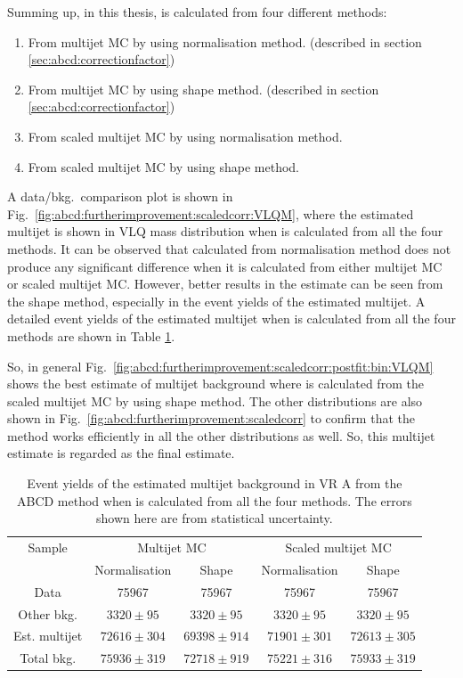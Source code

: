 Summing up, in this thesis, \R is calculated from four different methods:
\begin{enumerate}
	\item From multijet MC by using normalisation method. (described in section \ref{sec:abcd:correctionfactor})
	\item From multijet MC by using shape method. (described in section \ref{sec:abcd:correctionfactor})
	\item From scaled multijet MC by using normalisation method.
	\item From scaled multijet MC by using shape method.
\end{enumerate}

A data/bkg.\ comparison plot is shown in Fig.\ \ref{fig:abcd:furtherimprovement:scaledcorr:VLQM}, where the estimated multijet is shown in VLQ mass distribution when \R is calculated from all the four methods. It can be observed that \R calculated from normalisation method does not produce any significant difference when it is calculated from either multijet MC or scaled multijet MC. However, better results in the estimate can be seen from the shape method, especially in the event yields of the estimated multijet. A detailed event yields of the estimated multijet when \R is calculated from all the four methods are shown in Table \ref{table:abcd:furtherimprovement:scaledcorr}. 

So, in general Fig.\ \ref{fig:abcd:furtherimprovement:scaledcorr:postfit:bin:VLQM} shows the best estimate of multijet background where \R is calculated from the scaled multijet MC by using shape method. The other distributions are also shown in Fig.\ \ref{fig:abcd:furtherimprovement:scaledcorr} to confirm that the method works efficiently in all the other distributions as well. So, this multijet estimate is regarded as the final estimate.

\begin{table}[hbt!]
	\centering
	\begin{tabular}{c|c|c|c|c} 
		\toprule
		Sample & \multicolumn{2}{c}{Multijet MC} \vline & \multicolumn{2}{c}{Scaled multijet MC} \\ \cline{2-5} 
		 & Normalisation & Shape & Normalisation & Shape \\ 
		\midrule
		Data & 75967 & 75967 & 75967 & 75967 \\
		Other bkg. & $\num{3320}\pm\num{95}$ & $\num{3320}\pm\num{95}$ & $\num{3320}\pm\num{95}$ & $\num{3320}\pm\num{95}$ \\
		Est. multijet & $\num{72616}\pm\num{304}$ & $\num{69398}\pm\num{914}$ & $\num{71901}\pm\num{301}$ & $\num{72613}\pm\num{305}$ \\
		\midrule
		Total bkg. & $\num{75936}\pm\num{319}$ & $\num{72718}\pm\num{919}$ & $\num{75221}\pm\num{316}$ & $\num{75933}\pm\num{319}$ \\
		\bottomrule
	\end{tabular}
	\caption{Event yields of the estimated multijet background in VR A from the ABCD method when \R is calculated from all the four methods. The errors shown here are from statistical uncertainty.}
	\label{table:abcd:furtherimprovement:scaledcorr}
\end{table}


